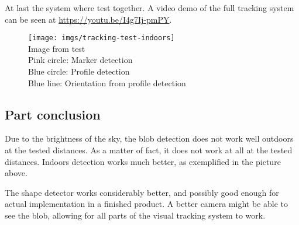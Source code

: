 At last the system where test together. A video demo of the full tracking system can be seen at \url{https://youtu.be/I4g7Ij-pmPY}.
\begin{figure}
	\centering
	\texttt{[image: imgs/tracking-test-indoors]}\\
	Image from test\\Pink circle: Marker detection\\
	Blue circle: Profile detection\\Blue line: Orientation from profile detection
\end{figure}
\subsection{Part conclusion}
Due to the brightness of the sky, the blob detection does not work well outdoors at the tested distances. As a matter of fact, it does not work at all at the tested distances. Indoors detection works much better, as exemplified in the picture above. 

The shape detector works considerably better, and possibly good enough for actual implementation in a finished product. A better camera might be able to see the blob, allowing for all parts of the visual tracking system to work.